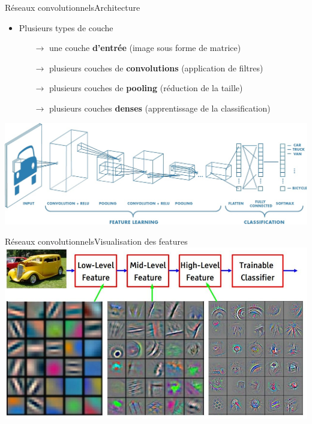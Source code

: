 \documentclass[compress]{beamer}
\begin{document}
\begin{frame}{Réseaux convolutionnels}{Architecture}
	\begin{itemize}
		\item Plusieurs types de couche
  	\begin{itemize}
  		\item[$\rightarrow$] une couche \textbf{\color{fibeamer@orange}d'entrée} (image sous forme de matrice)
  		\item[$\rightarrow$] plusieurs couches de \textbf{\color{fibeamer@orange}convolutions} (application de filtres)
  		\item[$\rightarrow$] plusieurs couches de \textbf{\color{fibeamer@orange}pooling} (réduction de la taille)
  		 \item[$\rightarrow$] plusieurs couches \textbf{\color{fibeamer@orange}denses} (apprentissage de la classification)
  	\end{itemize}
	\end{itemize}
	\bigskip
	\centering
	\includegraphics[width=1\linewidth]{resources/clem/convolutional_netowrk}
\end{frame}

\begin{frame}{Réseaux convolutionnels}{Visualisation des features}
	\centering
	\includegraphics[width=1\linewidth]{resources/clem/features}
\end{frame}
\end{document}
